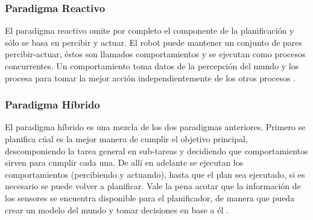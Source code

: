 \subsubsection{Paradigma Reactivo}
El paradigma reactivo omite por completo el componente de la planificación y s\'olo se basa en percibir y actuar. El robot puede mantener un conjunto de pares percibir-actuar, \'estos son llamados comportamientos y se ejecutan como procesos concurrentes. Un comportamiento toma datos de la percepción del mundo y los procesa para tomar la mejor acción independientemente de los otros procesos \cite{AiRobotics}.

\subsubsection{Paradigma Híbrido}
El paradigma híbrido es una mezcla de los dos paradigmas anteriores. Primero se planifica cúal es la mejor manera de cumplir el objetivo principal, descomponiendo la tarea general en sub-tareas y decidiendo que comportamientos sirven para cumplir cada una. De allí en adelante se ejecutan los comportamientos (percibiendo y actuando), hasta que el plan sea ejecutado, si es necesario se puede volver a planificar. Vale la pena acotar que la información de los sensores se encuentra disponible para el planificador, de manera que pueda crear un modelo del mundo y tomar decisiones en base a él  \cite{AiRobotics}. 
